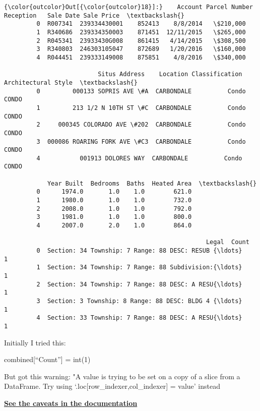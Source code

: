 \documentclass[11pt]{article}
\begin{document}
\begin{Verbatim}[commandchars=\\\{\}]
{\color{outcolor}Out[{\color{outcolor}18}]:}    Account Parcel Number Reception   Sale Date Sale Price  \textbackslash{}
         0  R007341  239334430001    852413    8/8/2014   \$210,000   
         1  R340686  239334350003    871451  12/11/2015   \$265,000   
         2  R045341  23933430G008    861415   4/14/2015   \$308,500   
         3  R340803  246303105047    872689   1/20/2016   \$160,000   
         4  R044451  239333149008    875851    4/8/2016   \$340,000   
         
                          Situs Address    Location Classification Architectural Style  \textbackslash{}
         0         000133 SOPRIS AVE \#A  CARBONDALE          Condo               CONDO   
         1         213 1/2 N 10TH ST \#C  CARBONDALE          Condo               CONDO   
         2     000345 COLORADO AVE \#202  CARBONDALE          Condo               CONDO   
         3  000086 ROARING FORK AVE \#C3  CARBONDALE          Condo               CONDO   
         4           001913 DOLORES WAY  CARBONDALE          Condo               CONDO   
         
            Year Built  Bedrooms  Baths  Heated Area  \textbackslash{}
         0      1974.0       1.0    1.0        621.0   
         1      1980.0       1.0    1.0        732.0   
         2      2008.0       1.0    1.0        792.0   
         3      1981.0       1.0    1.0        800.0   
         4      2007.0       2.0    1.0        864.0   
         
                                                        Legal  Count  
         0  Section: 34 Township: 7 Range: 88 DESC: RESUB {\ldots}      1  
         1  Section: 34 Township: 7 Range: 88 Subdivision:{\ldots}      1  
         2  Section: 34 Township: 7 Range: 88 DESC: A RESU{\ldots}      1  
         3  Section: 3 Township: 8 Range: 88 DESC: BLDG 4 {\ldots}      1  
         4  Section: 33 Township: 7 Range: 88 DESC: A RESU{\ldots}      1  
\end{Verbatim}
            
    Initially I tried this:

combined{[}``Count''{]} = int(1)

But got this warning: "A value is trying to be set on a copy of a slice
from a DataFrame. Try using `.loc{[}row\_indexer,col\_indexer{]} =
value' instead

\textbf{\href{http://pandas.pydata.org/pandas-docs/stable/indexing.html\#indexing-view-versus-copy}{See
the caveats in the documentation}}
\end{document}
